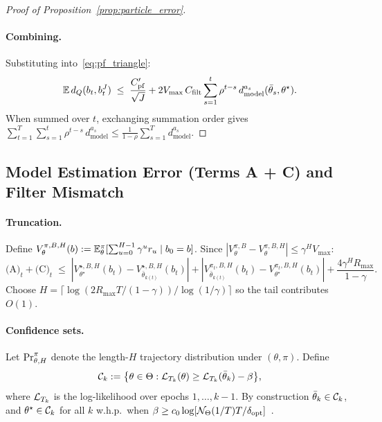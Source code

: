 \begin{proof}[Proof of Proposition~\ref{prop:particle_error}]
\paragraph{Combining.}
Substituting into~\eqref{eq:pf_triangle}:
\[
\mathbb{E}\,d_Q(b_t,b_t^J)
\;\le\;
\frac{C_{\mathrm{pf}}'}{\sqrt{J}}+2V_{\max}\,C_{\mathrm{filt}}\sum_{s=1}^t\rho^{t-s}\,d_{\mathrm{model}}^{a_s}(\bar\theta_s,\theta^\star).
\]
When summed over $t$, exchanging summation order gives
$\sum_{t=1}^T\sum_{s=1}^t\rho^{t-s}\,d_{\mathrm{model}}^{a_s}
\le\frac{1}{1-\rho}\sum_{s=1}^T d_{\mathrm{model}}^{a_s}.$
\end{proof}


\subsection{Model Estimation Error (Terms A + C) and Filter Mismatch}
\label{app:model_error_proofs}

\paragraph{Truncation.}
Define $V_\theta^{\pi,B,H}(b):=\mathbb{E}_\theta^\pi[\sum_{u=0}^{H-1}\gamma^u r_u\mid b_0=b]$. Since $|V_\theta^{\pi,B}-V_\theta^{\pi,B,H}|\le \gamma^H V_{\max}$:
\begin{equation}\label{eq:truncation_error}
\text{(A)}_t+\text{(C)}_t
\;\le\;
|V_{\theta^\star}^{\star,B,H}(b_t)-V_{\bar\theta_{k(t)}}^{\star,B,H}(b_t)|
+|V_{\bar\theta_{k(t)}}^{\pi_t,B,H}(b_t)-V_{\theta^\star}^{\pi_t,B,H}(b_t)|
+\frac{4\gamma^H R_{\max}}{1-\gamma}.
\end{equation}
Choose $H=\lceil\log(2R_{\max}T/(1-\gamma))/\log(1/\gamma)\rceil$ so the tail contributes $O(1)$.

\paragraph{Confidence sets.}
Let $\operatorname{Pr}_{\theta,H}^\pi$ denote the length-$H$ trajectory distribution under $(\theta,\pi)$. Define
\begin{equation}\label{eq:conf_set}
{\mathcal{C}}_k:=\bigl\{\theta\in\Theta:{\mathcal{L}}_{T_k}(\theta)\ge {\mathcal{L}}_{T_k}(\bar\theta_k)-\beta\bigr\},
\end{equation}
where ${\mathcal{L}}_{T_k}$ is the log-likelihood over epochs $1,\ldots,k-1$. By construction $\bar\theta_k\in{\mathcal{C}}_k$, and $\theta^\star\in{\mathcal{C}}_k$ for all $k$ w.h.p.\ when $\beta\ge c_0\log[{\mathcal{N}}_\Theta(1/T)T/\delta_{\mathrm{opt}}]$~\citep[Prop.~B.1]{liu2023optimistic}.

